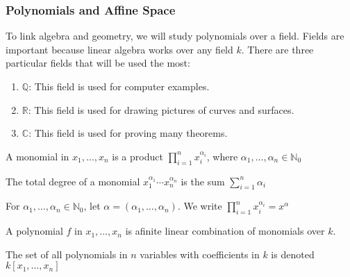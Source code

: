 \documentclass[crop=false,class=book,oneside]{standalone}
\begin{document}
            \subsubsection{Polynomials and Affine Space}
                To link algebra and geometry, we will study
                polynomials over a field. Fields are important
                because linear algebra works over any field $k$.
                There are three particular fields that will
                be used the most:
                \begin{enumerate}
                    \item $\mathbb{Q}$: This field is used
                          for computer examples.
                    \item $\mathbb{R}$: This field is used
                          for drawing pictures of curves and surfaces.
                    \item $\mathbb{C}$: This field is used
                          for proving many theorems.
                \end{enumerate}
                \begin{definition}
                    A monomial in $x_1,\hdots,x_n$ is a product
                    $\prod_{i=1}^{n}x_{i}^{\alpha_{i}}$, where
                    $\alpha_{1},\hdots,\alpha_{n}\in\mathbb{N}_0$
                \end{definition}
                \begin{definition}
                    The total degree of a monomial
                    $x_1^{\alpha_1}\cdots x_n^{\alpha_n}$ is
                    the sum $\sum_{i=1}^{n}\alpha_{i}$
                \end{definition}
                \begin{notation}
                    For $\alpha_1,\hdots,\alpha_n\in\mathbb{N}_0$,
                    let $\alpha=(\alpha_1,\hdots,\alpha_n)$.
                    We write
                    $\prod_{i=1}^{n}x_{i}^{\alpha_{i}}=x^{\alpha}$
                \end{notation}
                \begin{definition}
                    A polynomial $f$ in $x_1,\hdots, x_n$
                    is afinite linear combination of
                    monomials over $k$.
                \end{definition}
                \begin{notation}
                    The set of all polynomials in $n$
                    variables with coefficients in $k$ is
                    denoted $k[x_1,\hdots ,x_n]$
                \end{notation}
\end{document}
